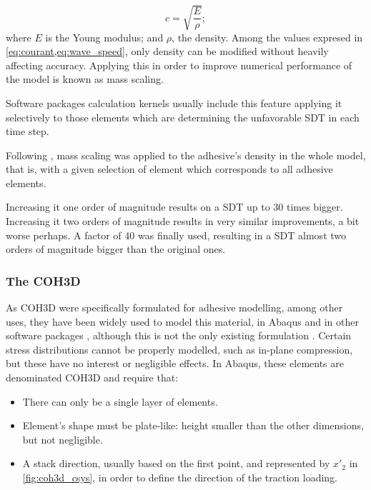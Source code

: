 \documentclass[cmfonts]{witpress}
\begin{document}
\begin{equation}
c = \sqrt{\frac{E}{\rho}} ;
\label{eq:wave_speed}
\end{equation}
where $E$ is the Young modulus; and $\rho$, the density. Among the values expresed in \cref{eq:courant,eq:wave_speed}, only density can be modified without heavily affecting accuracy. Applying this in order to improve numerical performance of the model is known as mass scaling.

Software packages calculation kernels usually include this feature applying it selectively to those elements which are determining the unfavorable SDT in each time step.

Following \cite{Scattina2011}, mass scaling was applied to the adhesive's density in the whole model, that is, with a given selection of element which corresponds to all adhesive elements.

Increasing it one order of magnitude results on a SDT up to 30 times bigger. Increasing it two orders of magnitude results in very similar improvements, a bit worse perhaps. A factor of 40 was finally used, resulting in a SDT almost two orders of magnitude bigger than the original ones.

\subsubsection{The \acrlong{COH3D}}
\label{sec:coh_elem}

As \acrlong{COH3D} were specifically formulated for adhesive modelling, among other uses, they have been widely used to model this material, in Abaqus \cite{Sadowski2010, Sadowski2011, Sadowski2014, Alvarez2014} and in other software packages \cite{Sato2000, Carlberger2007, Loureiro2010, Scattina2011, Ghasemnejad2013}, although this is not the only existing formulation \cite{Sato2000, Greve2007, Liao2011, Yang2012}. Certain stress distributions cannot be properly modelled, such as in-plane compression, but these have no interest or negligible effects. In Abaqus, these elements are denominated \acrshort{COH3D} and require that:
\begin{itemize}
	\item There can only be a single layer of elements.

	\item Element's shape must be plate-like: height smaller than the other dimensions, but not negligible.

	\item A stack direction, usually based on the first point, and represented by $x'_{2}$ in \cref{fig:coh3d_csys}, in order to define the direction of the traction loading.
\end{itemize}
\end{document}
